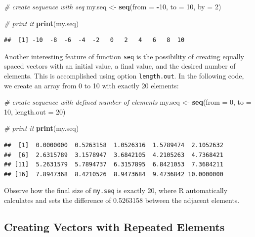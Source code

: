\documentclass[11pt,]{book}
\newenvironment{Shaded}{\begin{snugshade}}{\end{snugshade}}
\newcommand{\KeywordTok}[1]{\textcolor[rgb]{0.27,0.27,0.27}{\textbf{#1}}}
\newcommand{\DataTypeTok}[1]{\textcolor[rgb]{0.27,0.27,0.27}{#1}}
\newcommand{\DecValTok}[1]{\textcolor[rgb]{0.06,0.06,0.06}{#1}}
\newcommand{\StringTok}[1]{\textcolor[rgb]{0.5,0.5,0.5}{#1}}
\newcommand{\CommentTok}[1]{\textcolor[rgb]{0.56,0.35,0.01}{\textit{#1}}}
\newcommand{\OperatorTok}[1]{\textcolor[rgb]{0.81,0.36,0.00}{\textbf{#1}}}
\newcommand{\NormalTok}[1]{#1}
\begin{document}
\begin{Shaded}
\begin{Highlighting}[]
\CommentTok{# create sequence with seq}
\NormalTok{my.seq <-}\StringTok{ }\KeywordTok{seq}\NormalTok{(}\DataTypeTok{from =} \OperatorTok{-}\DecValTok{10}\NormalTok{, }\DataTypeTok{to =} \DecValTok{10}\NormalTok{, }\DataTypeTok{by =} \DecValTok{2}\NormalTok{)}

\CommentTok{# print it}
\KeywordTok{print}\NormalTok{(my.seq)}
\end{Highlighting}
\end{Shaded}

\begin{verbatim}
##  [1] -10  -8  -6  -4  -2   0   2   4   6   8  10
\end{verbatim}

Another interesting feature of function \texttt{seq} is the possibility
of creating equally spaced vectors with an initial value, a final value,
and the desired number of elements. This is accomplished using option
\texttt{length.out}. In the following code, we create an array from 0 to
10 with exactly 20 elements:

\begin{Shaded}
\begin{Highlighting}[]
\CommentTok{# create sequence with defined number of elements}
\NormalTok{my.seq <-}\StringTok{ }\KeywordTok{seq}\NormalTok{(}\DataTypeTok{from =} \DecValTok{0}\NormalTok{, }\DataTypeTok{to =} \DecValTok{10}\NormalTok{, }\DataTypeTok{length.out =} \DecValTok{20}\NormalTok{)}

\CommentTok{# print it}
\KeywordTok{print}\NormalTok{(my.seq)}
\end{Highlighting}
\end{Shaded}

\begin{verbatim}
##  [1]  0.0000000  0.5263158  1.0526316  1.5789474  2.1052632
##  [6]  2.6315789  3.1578947  3.6842105  4.2105263  4.7368421
## [11]  5.2631579  5.7894737  6.3157895  6.8421053  7.3684211
## [16]  7.8947368  8.4210526  8.9473684  9.4736842 10.0000000
\end{verbatim}

Observe how the final size of \texttt{my.seq} is exactly 20, where R
automatically calculates and sets the difference of 0.5263158 between
the adjacent elements.

\subsection{Creating Vectors with Repeated
Elements}\label{creating-vectors-with-repeated-elements}
\end{document}
